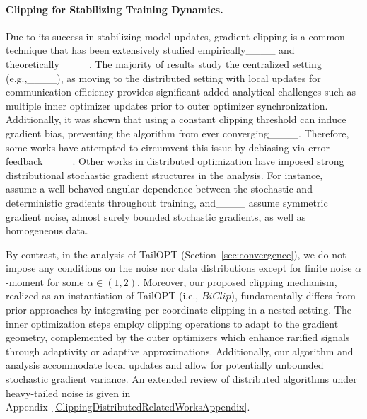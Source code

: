 \paragraph{Clipping for Stabilizing Training Dynamics.} 
Due to its success in stabilizing model updates, gradient clipping is a common technique that has been extensively studied empirically____ and theoretically____. 
The majority of results study the centralized setting (e.g.,____), as moving to the distributed setting with local updates for communication efficiency provides significant added analytical challenges such as multiple inner optimizer updates prior to outer optimizer synchronization. Additionally, it was shown that using a constant clipping threshold can induce gradient bias, preventing the algorithm from ever converging____. Therefore, some works have attempted to circumvent this issue by debiasing via error feedback____. Other works in distributed optimization have imposed strong distributional stochastic gradient structures in the analysis. For instance,____
assume a well-behaved angular dependence between the stochastic and deterministic gradients throughout training, and____ assume symmetric gradient noise, almost surely bounded stochastic gradients, as well as homogeneous data. 

By contrast, in the analysis of TailOPT (Section~\ref{sec:convergence}), we do not impose any conditions on the noise nor data distributions except for finite noise $\alpha$-moment for some $\alpha \in (1,2)$.  Moreover, our proposed clipping mechanism, realized as an instantiation of TailOPT (i.e., $BiClip$), fundamentally differs from prior approaches by integrating per-coordinate clipping in a nested setting. The inner optimization steps employ clipping operations to adapt to the gradient geometry, 
complemented by the outer optimizers which enhance rarified signals through adaptivity or adaptive approximations. Additionally, our algorithm and analysis accommodate local updates and allow for potentially unbounded stochastic gradient variance.
An extended review of distributed algorithms under heavy-tailed noise is given in Appendix~\ref{ClippingDistributedRelatedWorksAppendix}.